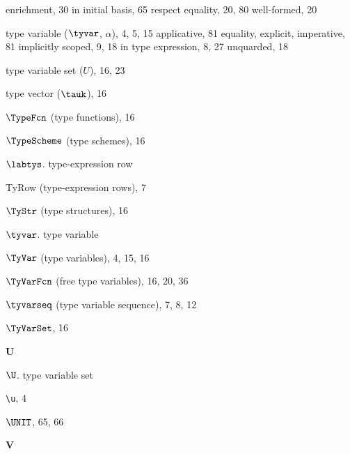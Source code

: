 \begin{theindex}
\subitem enrichment, 30
\subitem in initial basis, 65
\subitem respect equality, 20, 80
\subitem well-formed, 20
\item type variable ($\tyvar$, $\alpha$), 4, 5, 15
\subitem applicative, 81
\subitem equality, \eqtyvarrefs
\subitem explicit, \scopeexpltyvarsrefs
\subitem imperative, 81
\subitem implicitly scoped, 9, 18
\subitem in type expression, 8, 27
\subitem unquarded, 18
\item type variable set ($U$), 16, 23
\item type vector ($\tauk$), 16
\item $\TypeFcn$ (type functions), 16
\item $\TypeScheme$ (type schemes), 16
\item $\labtys$. \see type-expression row
\item TyRow (type-expression rows), 7
\item $\TyStr$ (type structures), 16
\item $\tyvar$.  \see type variable
\item $\TyVar$ (type variables), 4, 15, 16
\item $\TyVarFcn$ (free type variables), 16, 20, 36
\item $\tyvarseq$ (type variable sequence), 7, 8, 12
\item $\TyVarSet$, 16
\indexspace

\parbox{64mm}{\hfil{\large\bf U}\hfil}

\indexspace

\item $\U$. \see type variable set
\item \verb+\u+, 4
\item $\UNIT$, 65, 66
\indexspace

\parbox{64mm}{\hfil{\large\bf V}\hfil}

\indexspace


\end{theindex}
